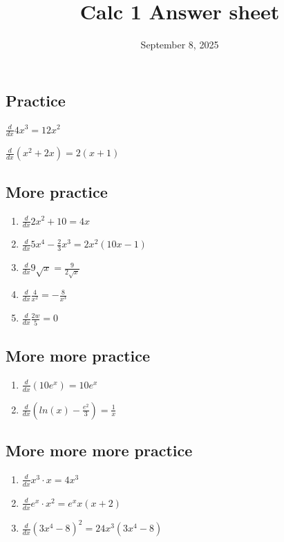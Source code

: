 \documentclass[
  letterpaper,
  DIV=11,
  numbers=noendperiod]{scrartcl}
\title{Calc 1 Answer sheet}
\author{}
\date{September 8, 2025}
\providecommand{\tightlist}{%
  \setlength{\itemsep}{0pt}\setlength{\parskip}{0pt}}\usepackage{longtable,booktabs,array}
\begin{document}
\maketitle


\subsection{Practice}\label{practice}

\(\frac{d}{dx}4x^3 = 12x^2\)

\(\frac{d}{dx}(x^2 + 2x) = 2(x+1)\)

\subsection{More practice}\label{more-practice}

\begin{enumerate}
\def\labelenumi{\arabic{enumi})}
\tightlist
\item
  \(\frac{d}{dx}2x^2 + 10 = 4x\)
\item
  \(\frac{d}{dx}5x^4 - \frac{2}{3}x^3 = 2x^2(10x-1)\)
\item
  \(\frac{d}{dx}9 \sqrt x = \frac{9}{2\sqrt{x}}\)
\item
  \(\frac{d}{dx}\frac{4}{x^2} = - \frac{8}{x^3}\)
\item
  \(\frac{d}{dx}\frac{2w}{5} = 0\)
\end{enumerate}

\subsection{More more practice}\label{more-more-practice}

\begin{enumerate}
\def\labelenumi{\arabic{enumi})}
\item
  \(\frac{d}{dx}(10e^x) = 10e^x\)
\item
  \(\frac{d}{dx}(ln(x) - \frac{e^2}{3}) = \frac{1}{x}\)
\end{enumerate}

\subsection{More more more practice}\label{more-more-more-practice}

\begin{enumerate}
\def\labelenumi{\arabic{enumi})}
\tightlist
\item
  \(\frac{d}{dx}x^3 \cdot x = 4x^3\)
\item
  \(\frac{d}{dx}e^x \cdot x^2 = e^x x(x+2)\)
\item
  \(\frac{d}{dx}(3x^4-8)^2 = 24x^3(3x^4-8)\)
\end{enumerate}
\end{document}
